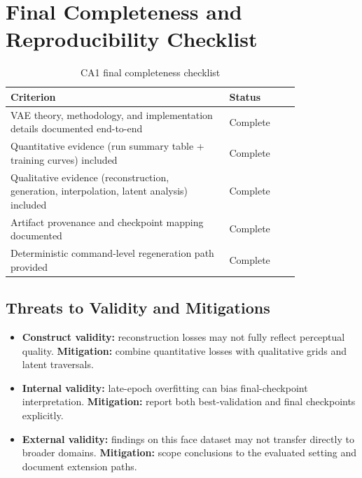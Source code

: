 \documentclass[conference]{IEEEtran}
\begin{document}
\section{Final Completeness and Reproducibility Checklist}

\begin{table}[!t]
\centering
\caption{CA1 final completeness checklist}
\begin{tabular}{|p{0.62\linewidth}|p{0.20\linewidth}|}
\hline
\textbf{Criterion} & \textbf{Status} \\
\hline
VAE theory, methodology, and implementation details documented end-to-end & Complete \\
\hline
Quantitative evidence (run summary table + training curves) included & Complete \\
\hline
Qualitative evidence (reconstruction, generation, interpolation, latent analysis) included & Complete \\
\hline
Artifact provenance and checkpoint mapping documented & Complete \\
\hline
Deterministic command-level regeneration path provided & Complete \\
\hline
\end{tabular}
\label{tab:ca1_final_completeness}
\end{table}

\subsection{Threats to Validity and Mitigations}
\begin{itemize}
    \item \textbf{Construct validity:} reconstruction losses may not fully reflect perceptual quality. \textbf{Mitigation:} combine quantitative losses with qualitative grids and latent traversals.
    \item \textbf{Internal validity:} late-epoch overfitting can bias final-checkpoint interpretation. \textbf{Mitigation:} report both best-validation and final checkpoints explicitly.
    \item \textbf{External validity:} findings on this face dataset may not transfer directly to broader domains. \textbf{Mitigation:} scope conclusions to the evaluated setting and document extension paths.
\end{itemize}
\end{document}
